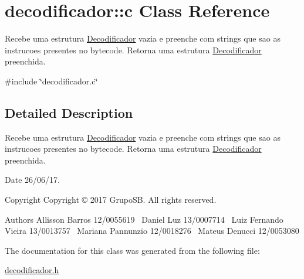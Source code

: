 \hypertarget{classdecodificador_1_1c}{}\section{decodificador\+:\+:c Class Reference}
\label{classdecodificador_1_1c}


Recebe uma estrutura \hyperlink{structDecodificador}{Decodificador} vazia e preenche com strings que sao as instrucoes presentes no bytecode. Retorna uma estrutura \hyperlink{structDecodificador}{Decodificador} preenchida.  




{\ttfamily \#include \char`\"{}decodificador.\+c\char`\"{}}



\subsection{Detailed Description}
Recebe uma estrutura \hyperlink{structDecodificador}{Decodificador} vazia e preenche com strings que sao as instrucoes presentes no bytecode. Retorna uma estrutura \hyperlink{structDecodificador}{Decodificador} preenchida. 

\begin{DoxyDate}{Date}
26/06/17. 
\end{DoxyDate}
\begin{DoxyCopyright}{Copyright}
Copyright © 2017 Grupo\+SB. All rights reserved.
\end{DoxyCopyright}
\begin{DoxyAuthor}{Authors}
Allisson Barros 12/0055619~\newline
 Daniel Luz 13/0007714~\newline
 Luiz Fernando Vieira 13/0013757~\newline
 Mariana Pannunzio 12/0018276~\newline
 Mateus Denucci 12/0053080 
\end{DoxyAuthor}


The documentation for this class was generated from the following file\+:\begin{DoxyCompactItemize}
\item 
\hyperlink{decodificador_8h}{decodificador.\+h}\end{DoxyCompactItemize}
